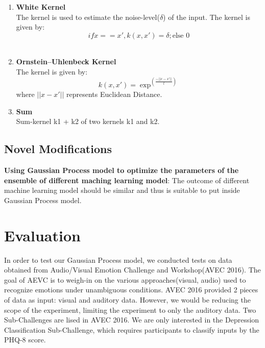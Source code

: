 \documentclass{article}
\begin{document}
\begin{enumerate}
		\item \textbf{White Kernel}\\
		The kernel is used to estimate the noise-level(\(\delta\)) of the input. 
		The kernel is given by:
		\begin{equation}\label{eq:kernel_noise}
			if x == x', k(x,x') = \delta ; \text{else 0}
		\end{equation}
		\\

		\item \textbf{Ornstein–Uhlenbeck Kernel}\\
		The kernel is given by:
		\begin{equation}\label{eq:kernel_ou}
			k(x,x') = \exp^{(\frac{-||x - x'||}{l})}
		\end{equation}
		where \(||x - x'||\) represents Euclidean Distance. \\

		\item \textbf{Sum}\\
		Sum-kernel k1 + k2 of two kernels k1 and k2.\\
	\end{enumerate}

	\subsection{Novel Modifications}
	\textbf{Using Gaussian Process model to optimize the parameters of the ensemble of different maching learning model}: 
	The outcome of different machine learning model should be similar and thus is suitable to put inside Gaussian Process model.
	
	

	\section{Evaluation}
	In order to test our Gaussian Process model, we conducted tests on data obtained from Audio/Visual Emotion Challenge and Workshop(AVEC 2016). The goal of AEVC is to weigh-in on the various approaches(visual, audio) used to recognize emotions under unambiguous conditions. AVEC 2016 provided 2 pieces of data as input: visual and auditory data. However, we would be reducing the scope of the experiment, limiting the experiment to only the auditory data. Two Sub-Challenges are lised in AVEC 2016. We are only interested in the Depression Classification Sub-Challenge, which requires participants to classify inputs by the PHQ-8 score.
\end{document}
